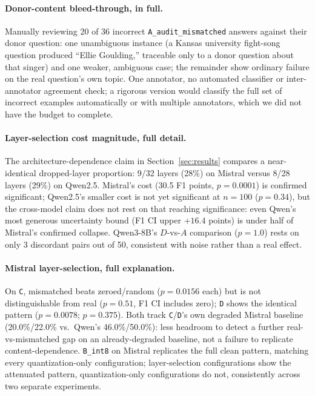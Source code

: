 \documentclass[11pt]{article}
\begin{document}
\paragraph{Donor-content bleed-through, in full.} Manually reviewing 20
of 36 incorrect \texttt{A\_audit\_mismatched} answers against their
donor question: one unambiguous instance (a Kansas university
fight-song question produced ``Ellie Goulding,'' traceable only to a
donor question about that singer) and one weaker, ambiguous case; the
remainder show ordinary failure on the real question's own topic. One
annotator, no automated classifier or inter-annotator agreement check;
a rigorous version would classify the full set of incorrect examples
automatically or with multiple annotators, which we did not have the
budget to complete.

\paragraph{Layer-selection cost magnitude, full detail.} The
architecture-dependence claim in Section~\ref{sec:results} compares a
near-identical dropped-layer proportion: 9/32 layers (28\%) on Mistral
versus 8/28 layers (29\%) on Qwen2.5. Mistral's cost (30.5 F1 points,
$p=0.0001$) is confirmed significant; Qwen2.5's smaller cost is not yet
significant at $n=100$ ($p=0.34$), but the cross-model claim does not
rest on that reaching significance: even Qwen's most generous
uncertainty bound (F1 CI upper $+16.4$ points) is under half of
Mistral's confirmed collapse. Qwen3-8B's $D$-vs-$A$ comparison ($p=1.0$)
rests on only 3 discordant pairs out of 50, consistent with noise
rather than a real effect.

\paragraph{Mistral layer-selection, full explanation.} On \texttt{C},
mismatched beats zeroed/random ($p=0.0156$ each) but is not
distinguishable from real ($p=0.51$, F1 CI includes zero); \texttt{D}
shows the identical pattern ($p=0.0078$; $p=0.375$). Both track
\texttt{C}/\texttt{D}'s own degraded Mistral baseline (20.0\%/22.0\%
vs.\ Qwen's 46.0\%/50.0\%): less headroom to detect a further
real-vs-mismatched gap on an already-degraded baseline, not a failure
to replicate content-dependence. \texttt{B\_int8} on Mistral replicates
the full clean pattern, matching every quantization-only configuration;
layer-selection configurations show the attenuated pattern,
quantization-only configurations do not, consistently across two
separate experiments.
\end{document}
